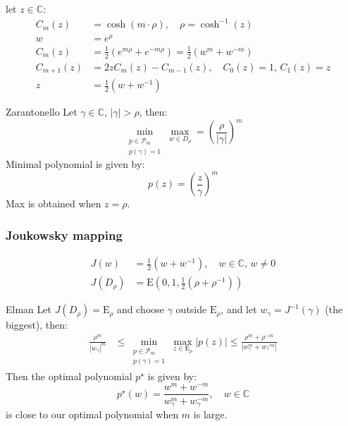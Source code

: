 let $z \in \mathbb{C}$:
\begin{align*}
    C_m(z)     & = \cosh(m \cdot \rho), \quad \rho = \cosh^{-1}(z)                 \\
    w          & = e^{\rho}                                                        \\
    C_m(z)     & = \frac{1}{2}(e^{m\rho} + e^{-m\rho}) = \frac{1}{2}(w^m + w^{-m}) \\
    C_{m+1}(z) & = 2zC_m(z) - C_{m-1}(z), \quad C_0(z) = 1, \, C_1(z) = z          \\
    z          & = \frac{1}{2}(w + w^{-1})
\end{align*}

\begin{lemma}{Zarantonello}{}
    Let $\gamma \in \mathbb{C}$, $|\gamma| > \rho$, then:
    \[
        \min_{\substack{p \in \mathcal{P}_m \\ p(\gamma) = 1}} \max_{w \in D_\rho} = \left(\frac{\rho}{|\gamma|}\right)^m
    \]
    Minimal polynomial is given by:
    \[
        p(z) = \left(\frac{z}{\gamma}\right)^m
    \]
    Max is obtained when $z = \rho$.
\end{lemma}

\subsubsection{Joukowsky mapping}
\begin{align*}
    J(w)      & = \frac{1}{2}(w + w^{-1}), \quad w \in \mathbb{C}, \, w \neq 0 \\
    J(D_\rho) & = \mathrm{E}(0,1, \frac12(\rho + \rho^{-1}))
\end{align*}
\begin{theorem}{Elman}{}
    Let $J(D_\rho) = \mathrm{E}_\rho$ and choose $\gamma$ outside $\mathrm{E}_\rho$, and let  $ w_\gamma = J^{-1}(\gamma)$ (the biggest), then:
    \begin{align*}
        \frac{\rho^m}{|w_\gamma|^m} & \leq \min_{\substack{p \in \mathcal{P}_m \\ p(\gamma) = 1}} \max_{z \in \mathrm{E}_\rho} |p(z)| \leq \frac{\rho^m + \rho^{-m}}{|w_\gamma^m + w_\gamma^{-m}|}
    \end{align*}
    Then the optimal polynomial $p^\star$ is given by:
    \[
        p^\star(w) = \frac{w^m + w^{-m}}{w_\gamma^m + w_\gamma^{-m}}, \quad w \in \mathbb{C}
    \]
    is close to our optimal polynomial when $m$ is large.
\end{theorem}

